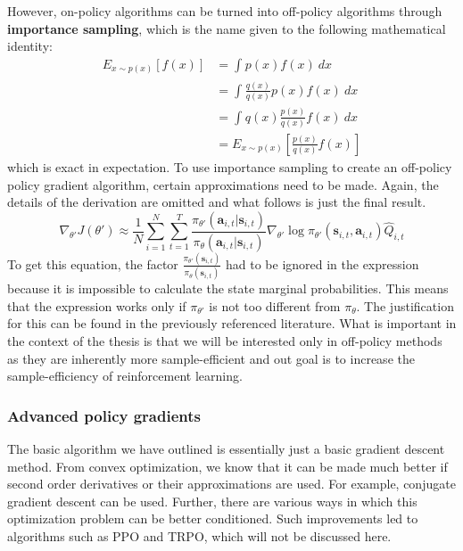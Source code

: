 However, on-policy algorithms can be turned into off-policy 
algorithms through \textbf{importance sampling},
which is the name given to the following mathematical identity:
\begin{align}
		E_{x \sim p(x)} [f(x)]  
		&= \int_{{}}^{{}} {p(x)f(x)} \: d{x} \\
		&= \int_{{}}^{{}} {\frac{q(x)}{q(x)}  p(x)f(x)} \: d{x} \\
		&= \int_{{}}^{{}} { q(x) \frac{p(x)}{q(x)}  f(x)} \: d{x} \\
		&= E_{x \sim p(x)} \left [ \frac{p(x)}{q(x)} f(x) \right ]
\end{align}
which is exact in expectation.
To use importance sampling to create an off-policy policy gradient algorithm,
certain approximations need to be made. Again, the details of the derivation
are omitted and what follows is just the final result.
\begin{equation}
		\nabla_{\theta'} J(\theta') \approx
		\frac{1}{N} \sum_{i=1}^{N} \sum_{t=1}^{T}
		\frac{\pi_{\theta'}( \bm{a}_{i,t} | \bm{s}_{i,t})}{\pi_{\theta}( \bm{a}_{i,t} | \bm{s}_{i,t})} 
		\nabla_{\theta'} \log \pi_{\theta'} (\bm{s}_{i,t}, \bm{a}_{i,t}) 
		\hat{Q}_{i,t} 
\end{equation}
To get this equation, the factor 
$ \frac{\pi_{\theta'}(\bm{s}_{i,t})}{\pi_{\theta}(\bm{s}_{i,t})}  $
had to be ignored in the expression because it is impossible 
to calculate the state marginal probabilities.
This means that the expression works only if $ \pi_{ \theta' }  $
is not too different from $ \pi_{ \theta }  $.
The justification for this can be found in the previously referenced literature.
What is important in the context of the thesis is that we will be interested only in
off-policy methods as they are inherently more sample-efficient and 
out goal is to increase the sample-efficiency of reinforcement learning.

\subsubsection{Advanced policy gradients}
The basic algorithm we have outlined is essentially just a basic gradient descent method. 
From convex optimization, we know that it can be made much better if second order derivatives
or their approximations are used.
For example, conjugate gradient descent can be used.
Further, there are various ways in which this optimization problem can be better conditioned.
Such improvements led to algorithms such as PPO and TRPO,
which will not be discussed here.

